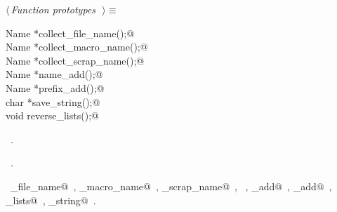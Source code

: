 \documentclass{report}
\begin{document}
\begin{flushleft} \small
\begin{minipage}{\linewidth} \label{scrap194}
$\langle\,${\it Function prototypes}\nobreak\ {\footnotesize {}}$\,\rangle\equiv$
\vspace{-1ex}
\begin{list}{}{} \item
\mbox{}\verb@extern Name *collect_file_name();@\\
\mbox{}\verb@extern Name *collect_macro_name();@\\
\mbox{}\verb@extern Name *collect_scrap_name();@\\
\mbox{}\verb@extern Name *name_add();@\\
\mbox{}\verb@extern Name *prefix_add();@\\
\mbox{}\verb@extern char *save_string();@\\
\mbox{}\verb@extern void reverse_lists();@\\
\mbox{}\verb@@{\NWsep}
\end{list}
\vspace{-1ex}
\footnotesize\addtolength{\baselineskip}{-1ex}
\begin{list}{}{\setlength{\itemsep}{-\parsep}\setlength{\itemindent}{-\leftmargin}}
\item \NWtxtMacroDefBy\ .
\item \NWtxtMacroRefIn\ .
\end{list}
\vspace{-2ex}
\footnotesize\addtolength{\baselineskip}{-1ex}
\begin{list}{}{\setlength{\itemsep}{-\parsep}\setlength{\itemindent}{-\leftmargin}}
\item \NWtxtIdentsUsed\nobreak\  \verb@collect_file_name@\nobreak\ , \verb@collect_macro_name@\nobreak\ , \verb@collect_scrap_name@\nobreak\ , \verb@Name@\nobreak\ , \verb@name_add@\nobreak\ , \verb@prefix_add@\nobreak\ , \verb@reverse_lists@\nobreak\ , \verb@save_string@\nobreak\ .\end{list}
\end{minipage}\\[4ex]
\end{flushleft}
\end{document}
